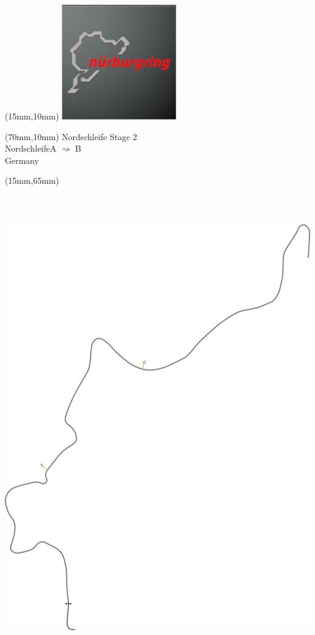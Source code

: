 \null\newpage
\begin{textblock*}{50mm}(15mm,10mm)%
\includegraphics[width=50mm]{LG/2015-05-20_00088.png}
\end{textblock*}
\begin{textblock*}{130mm}(70mm,10mm)%
{\fontsize{20}{20}\selectfont Nordschleife Stage 2\\}
{\fontsize{16}{16}\selectfont Nordschleife\hfill A $\rightsquigarrow$ B\\}
{\fontsize{12}{12}\selectfont Germany\\}
\end{textblock*}
\begin{textblock*}{185mm}(15mm,65mm)%
\centering
\mbox{\includegraphics[width=185mm,height=210mm,keepaspectratio]{PT/NOS2.pdf}}
\end{textblock*}
